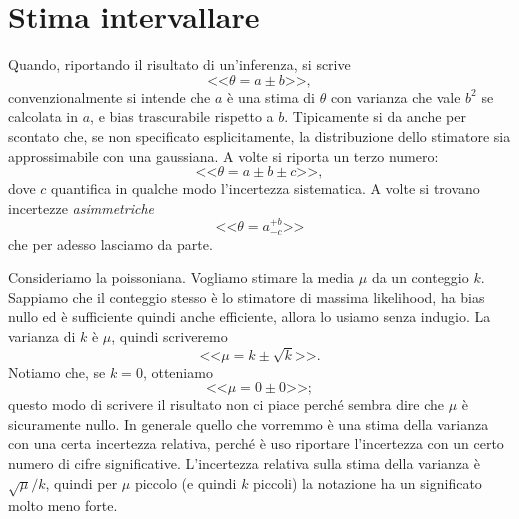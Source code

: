 
\section{Stima intervallare}

Quando, riportando il risultato di un'inferenza, si scrive
\begin{equation*}
	\text{<<}\theta = a \pm b\text{>>},
\end{equation*}
convenzionalmente si intende che $a$ è una stima di $\theta$ con varianza che vale $b^2$ se calcolata in $a$,
e bias trascurabile rispetto a $b$.
Tipicamente si da anche per scontato che,
se non specificato esplicitamente,
la distribuzione dello stimatore sia approssimabile con una gaussiana.
A volte si riporta un terzo numero:
\begin{equation*}
	\text{<<}\theta = a \pm b \pm c\text{>>},
\end{equation*}
dove $c$ quantifica in qualche modo l'incertezza sistematica.
A volte si trovano incertezze \emph{asimmetriche}
\begin{equation*}
	\text{<<}\theta = a^{+b}_{-c}\text{>>}
\end{equation*}
che per adesso lasciamo da parte.

\begin{example}
	Consideriamo la poissoniana.
	Vogliamo stimare la media $\mu$ da un conteggio $k$.
	Sappiamo che il conteggio stesso è lo stimatore di massima likelihood,
	ha bias nullo ed è sufficiente quindi anche efficiente,
	allora lo usiamo senza indugio.
	La varianza di $k$ è $\mu$,
	quindi scriveremo
	\begin{equation*}
		\text{<<}\mu = k \pm \sqrt k\text{>>}.
	\end{equation*}
	Notiamo che, se $k=0$, otteniamo
	\begin{equation*}
		\text{<<}\mu = 0 \pm 0\text{>>};
	\end{equation*}
	questo modo di scrivere il risultato non ci piace perché sembra dire che $\mu$ è sicuramente nullo.
	In generale quello che vorremmo è una stima della varianza con una certa incertezza relativa,
	perché è uso riportare l'incertezza con un certo numero di cifre significative.
	L'incertezza relativa sulla stima della varianza è $\sqrt\mu / k$,
	quindi per $\mu$ piccolo (e quindi $k$ piccoli) la notazione ha un significato molto meno forte.
\end{example}

